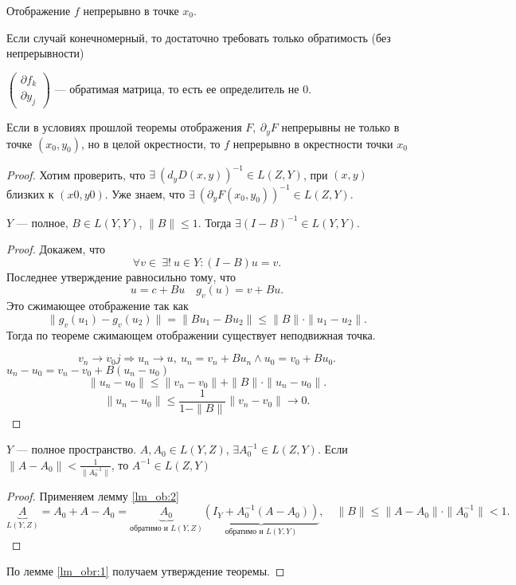 \begin{note}
    Отображение $ f$ непрерывно в точке $ x_0$.
\end{note}
\begin{note}
    Если случай конечномерный, то достаточно требовать только обратимость (без непрерывности)
\end{note}
\begin{note}
    $
    \begin{pmatrix}
        \partial f_k \\ \partial y_j
    \end{pmatrix}
    $ --- обратимая матрица,  то есть ее определитель не 0.
\end{note}
\begin{thm}
    Если в условиях прошлой теоремы отображения  $ F, ~\partial _yF$ непрерывны не только в точке $ (x_0, y_0)$, но в целой окрестности, то $ f$  непрерывно в окрестности точки  $ x_0$
\end{thm}
\begin{proof}
    Хотим проверить, что $ \exists ~ (d_y D(x, y))^{-1} \in L(Z, Y)$, при $ (x, y)$ близких к $ (x0, y0)$. Уже знаем, что $ \exists ~\left( \partial _yF(x_0, y_0) \right)^{-1} \in L(Z, Y)$.
    \begin{lm}\label{lm_ob:2}
	$ Y$ --- полное,  $ B \in L(Y, Y)$, $ \| B \|  \le  1 $. Тогда $ \exists ( I - B)^{-1} \in L(Y, Y)$.
    \end{lm}
    \begin{proof}
	Докажем, что
        \[
	    \forall v \in ~ \exists ! ~ u \in Y \colon (I-B) u = v  
        .\] 
	Последнее утверждение равносильно тому, что
	\[
	    u = c + Bu \quad g_v(u) = v + Bu
	.\] 
	Это сжимающее отображение так как
	\[
	    \|  g_v(u_1) - g_v(u_2) \| = \| Bu_1 - Bu_2 \| \le \| B \| \cdot \| u_1-u_2 \| 
	.\] 
	Тогда по теореме сжимающем отображении существует неподвижная точка.

	\[
	v_n \to  v_0j \Longrightarrow u_n \to  u, ~ u_n = v_n + B u_n \wedge  u_0  = v_0 + Bu_0
	.\] 
	$ u_n  - u_0 = v_n - v_0 + B\left( u_n - u_0 \right) $
	\[
	\| u_n - u_0 \| \le \| v_n - v_0 \| + \| B \| \cdot \|  u_n-u_0 \|    
	.\] 
	\[
	\|  u_n - u_0 \| \le \frac{1}{1-\|  B \| }  \|  v_n - v_0 \| \to  0
	.\] 
    \end{proof}
    \begin{lm}\label{lm_obr:1}
	$ Y $ --- полное пространство. $ A, A_0 \in  L(Y, Z)$, $ \exists  A_0^{-1} \in L(Z, Y)$. Если $ \| A-A_0 \| < \frac{1}{\| A_0^{-1} \| }$, то $ A^{-1} \in L(Z, Y)$ 
    \end{lm}
    \begin{proof}
	Применяем лемму \ref{lm_ob:2}
	\[
	\underbrace{A}_{L(Y, Z)} = A_0 + A - A_0 = \underbrace{A_0}_{\text{обратимо и }L(Y, Z)} \underbrace{(I_Y+A_0^{-1}(A-A_0))}_{\text{обратимо и }L(Y, Y)} , \quad \| B \| \le \| A-A_0 \| \cdot \|  A_0^{-1} \| <1 
	.\] 
    \end{proof}
    По лемме \ref{lm_obr:1} получаем утверждение теоремы.
\end{proof}
